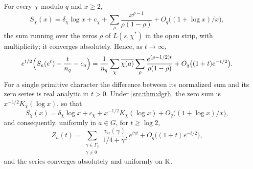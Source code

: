 \begin{lemma}\label{zer:lem:ramp}\label{rec:lem:ramp}
For every $\chi$ modulo $q$ and $x\ge2$,
\[
 S_\chi(x)=\delta_\chi\log x+c_\chi+\sum_\rho\frac{x^{\rho-1}}{\rho(1-\rho)}+O_q\bigl((1+\log x)/x\bigr),
\]
the sum running over the zeros $\rho$ of $L(s,\chi^*)$ in the open strip, with multiplicity; it
converges absolutely. Hence, as $t\to\infty$,
\[
 e^{t/2}\Bigl(S_a(e^t)-\frac t{n_q}-c_a\Bigr)=\frac1{n_q}\sum_{\chi}\overline{\chi(a)}\sum_\rho
 \frac{e^{(\rho-1/2)t}}{\rho(1-\rho)}+O_q\bigl((1+t)e^{-t/2}\bigr).
\]
For a single primitive character the difference between its normalized sum and its zero series is
real analytic in $t>0$. Under \cref{src:thm:dgrh} the zero sum is $x^{-1/2}K_\chi(\log x)$, so that
\[
 S_\chi(x)=\delta_\chi\log x+c_\chi+x^{-1/2}K_\chi(\log x)+O_q\bigl((1+\log x)/x\bigr),
\]
and consequently, uniformly in $a\in G$, for $t\ge\log2$,
\begin{equation}\label{zer:eq:Zexp}
 Z_a(t)=\sum_{\substack{\gamma\in\Gamma_q\\\gamma\ne0}}\frac{v_a(\gamma)}{1/4+\gamma^2}\,e^{i\gamma t}
 +O_q\bigl((1+t)e^{-t/2}\bigr),
\end{equation}
and the series converges absolutely and uniformly on $\mathbb{R}$.
\end{lemma}
